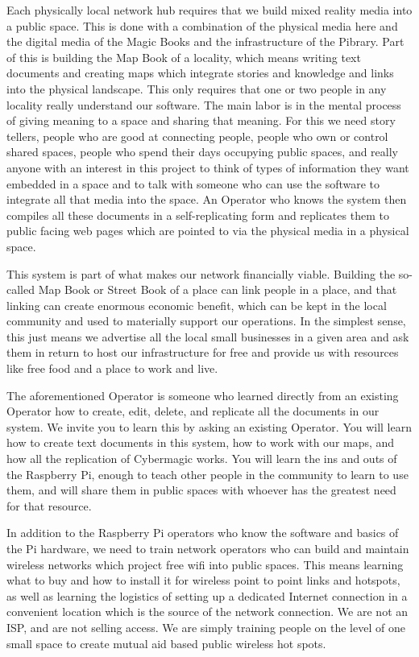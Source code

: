 Each physically local network hub requires that we build mixed reality
media into a public space. This is done with a combination of the
physical media here and the digital media of the Magic Books and the
infrastructure of the Pibrary. Part of this is building the Map Book of
a locality, which means writing text documents and creating maps which
integrate stories and knowledge and links into the physical landscape.
This only requires that one or two people in any locality really
understand our software. The main labor is in the mental process of
giving meaning to a space and sharing that meaning. For this we need
story tellers, people who are good at connecting people, people who own
or control shared spaces, people who spend their days occupying public
spaces, and really anyone with an interest in this project to think of
types of information they want embedded in a space and to talk with
someone who can use the software to integrate all that media into the
space. An Operator who knows the system then compiles all these
documents in a self-replicating form and replicates them to public
facing web pages which are pointed to via the physical media in a
physical space.

This system is part of what makes our network financially viable.
Building the so-called Map Book or Street Book of a place can link
people in a place, and that linking can create enormous economic
benefit, which can be kept in the local community and used to materially
support our operations. In the simplest sense, this just means we
advertise all the local small businesses in a given area and ask them in
return to host our infrastructure for free and provide us with resources
like free food and a place to work and live.

The aforementioned Operator is someone who learned directly from an
existing Operator how to create, edit, delete, and replicate all the
documents in our system. We invite you to learn this by asking an
existing Operator. You will learn how to create text documents in this
system, how to work with our maps, and how all the replication of
Cybermagic works. You will learn the ins and outs of the Raspberry Pi,
enough to teach other people in the community to learn to use them, and
will share them in public spaces with whoever has the greatest need for
that resource.

In addition to the Raspberry Pi operators who know the software and
basics of the Pi hardware, we need to train network operators who can
build and maintain wireless networks which project free wifi into public
spaces. This means learning what to buy and how to install it for
wireless point to point links and hotspots, as well as learning the
logistics of setting up a dedicated Internet connection in a convenient
location which is the source of the network connection. We are not an
ISP, and are not selling access. We are simply training people on the
level of one small space to create mutual aid based public wireless hot
spots.

